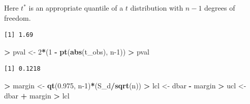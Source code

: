 \documentclass[
]{krantz}
\makeatletter
\newenvironment{Shaded}{\begin{snugshade}}{\end{snugshade}}
\newcommand{\DecValTok}[1]{\textcolor[rgb]{0.06,0.06,0.06}{#1}}
\newcommand{\FloatTok}[1]{\textcolor[rgb]{0.06,0.06,0.06}{#1}}
\newcommand{\KeywordTok}[1]{\textcolor[rgb]{0.27,0.27,0.27}{\textbf{#1}}}
\newcommand{\NormalTok}[1]{#1}
\newcommand{\OperatorTok}[1]{\textcolor[rgb]{0.43,0.43,0.43}{\textbf{#1}}}
\newcommand{\StringTok}[1]{\textcolor[rgb]{0.5,0.5,0.5}{#1}}
\newenvironment{kframe}{%
\medskip{}
\setlength{\fboxsep}{.8em}
 \def\at@end@of@kframe{}%
 \ifinner\ifhmode%
  \def\at@end@of@kframe{\end{minipage}}%
  \begin{minipage}{\columnwidth}%
 \fi\fi%
 \def\FrameCommand##1{\hskip\@totalleftmargin \hskip-\fboxsep
 \colorbox{shadecolor}{##1}\hskip-\fboxsep
     \hskip-\linewidth \hskip-\@totalleftmargin \hskip\columnwidth}%
 \MakeFramed {\advance\hsize-\width
   \@totalleftmargin\z@ \linewidth\hsize
   \@setminipage}}%
 {\par\unskip\endMakeFramed%
 \at@end@of@kframe}
\renewenvironment{Shaded}{\begin{kframe}}{\end{kframe}}
\makeatother
\begin{document}
Here \(t^*\) is an appropriate quantile of a \(t\) distribution with \(n-1\) degrees of freedom.

\begin{Shaded}
\end{Shaded}

\begin{verbatim}
[1] 1.69
\end{verbatim}

\begin{Shaded}
\begin{Highlighting}[]
\OperatorTok{\textgreater{}}\StringTok{ }\NormalTok{pval \textless{}{-}}\StringTok{ }\DecValTok{2}\OperatorTok{*}\NormalTok{(}\DecValTok{1} \OperatorTok{{-}}\StringTok{ }\KeywordTok{pt}\NormalTok{(}\KeywordTok{abs}\NormalTok{(t\_obs), n}\DecValTok{{-}1}\NormalTok{))}
\OperatorTok{\textgreater{}}\StringTok{ }\NormalTok{pval}
\end{Highlighting}
\end{Shaded}

\begin{verbatim}
[1] 0.1218
\end{verbatim}

\begin{Shaded}
\begin{Highlighting}[]
\OperatorTok{\textgreater{}}\StringTok{ }\NormalTok{margin \textless{}{-}}\StringTok{ }\KeywordTok{qt}\NormalTok{(}\FloatTok{0.975}\NormalTok{, n}\DecValTok{{-}1}\NormalTok{)}\OperatorTok{*}\NormalTok{(S\_d}\OperatorTok{/}\KeywordTok{sqrt}\NormalTok{(n))}
\OperatorTok{\textgreater{}}\StringTok{ }\NormalTok{lcl \textless{}{-}}\StringTok{ }\NormalTok{dbar }\OperatorTok{{-}}\StringTok{ }\NormalTok{margin}
\OperatorTok{\textgreater{}}\StringTok{ }\NormalTok{ucl \textless{}{-}}\StringTok{ }\NormalTok{dbar }\OperatorTok{+}\StringTok{ }\NormalTok{margin}
\OperatorTok{\textgreater{}}\StringTok{ }\NormalTok{lcl}
\end{Highlighting}
\end{Shaded}
\end{document}
